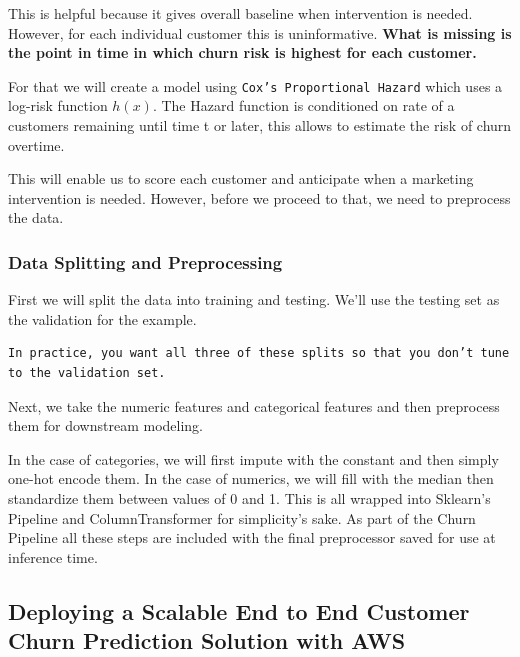 \documentclass[
]{book}
\begin{document}
This is helpful because it gives overall baseline when intervention is needed. However, for each individual customer this is uninformative.
\textbf{What is missing is the point in time in which churn risk is highest for each customer.}

For that we will create a model using \texttt{Cox’s\ Proportional\ Hazard} which uses a log-risk function \(h(x)\). The Hazard function is conditioned on rate of a customers remaining until time t or later, this allows to estimate the risk of churn overtime.

This will enable us to score each customer and anticipate when a marketing intervention is needed. However, before we proceed to that, we need to preprocess the data.

\hypertarget{data-splitting-and-preprocessing}{%
\subsubsection{Data Splitting and Preprocessing}\label{data-splitting-and-preprocessing}}

First we will split the data into training and testing. We'll use the testing set as the validation for the example.

\begin{verbatim}
In practice, you want all three of these splits so that you don’t tune to the validation set.
\end{verbatim}

Next, we take the numeric features and categorical features and then preprocess them for downstream modeling.

In the case of categories, we will first impute with the constant and then simply one-hot encode them. In the case of numerics, we will fill with the median then standardize them between values of 0 and 1. This is all wrapped into Sklearn's Pipeline and ColumnTransformer for simplicity's sake.
As part of the Churn Pipeline all these steps are included with the final preprocessor saved for use at inference time.

\hypertarget{deploying-a-scalable-end-to-end-customer-churn-prediction-solution-with-aws}{%
\subsection{Deploying a Scalable End to End Customer Churn Prediction Solution with AWS}\label{deploying-a-scalable-end-to-end-customer-churn-prediction-solution-with-aws}}
\end{document}
